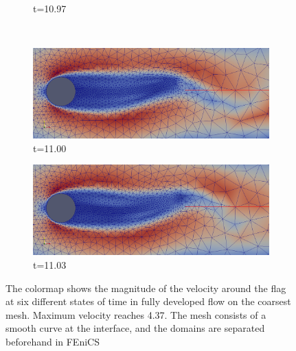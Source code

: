 \begin{center}
\begin{figure}[!ht]
\begin{subfigure}[b]{0.5\linewidth}
\caption{t=10.97}
\end{subfigure} \\
\begin{subfigure}[b]{0.5\linewidth}
\includegraphics[width=\linewidth]{figures/FSI3/coarse/FSI_mesh_5}
\caption{t=11.00}
\end{subfigure}
\begin{subfigure}[b]{0.5\linewidth}
\includegraphics[width=\linewidth]{figures/FSI3/coarse/FSI_mesh_6}
\caption{t=11.03}
\end{subfigure}
\caption{The colormap shows the magnitude of the velocity around the flag at six different states of time in fully developed flow on the coarsest mesh. Maximum velocity reaches 4.37. The mesh consists of a smooth curve at the interface, and the domains are separated beforehand in FEniCS}
\end{figure}
\end{center}
